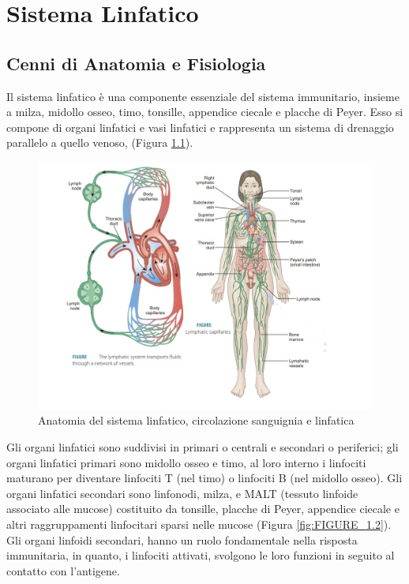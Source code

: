 \chapter{Sistema Linfatico}

\section{Cenni di Anatomia e Fisiologia}
Il sistema linfatico \`e una componente essenziale del sistema immunitario, 
insieme a milza, midollo osseo, timo, tonsille, appendice ciecale e placche di Peyer. 
Esso si compone di organi linfatici e vasi linfatici e rappresenta 
un sistema di drenaggio parallelo a quello venoso\cite{BOOK1}, (Figura \ref{fig:FIGURE_1.1}).\\

\begin{figure}[H]
    \begin{center}
    \includegraphics[width=0.9\columnwidth]{img/ANATOMY2.jpeg}
    \vspace{-3mm}
    \end{center}
    \caption{Anatomia del sistema linfatico, circolazione sanguignia e linfatica
    \cite{img1}}
    \label{fig:FIGURE_1.1}
\end{figure}


Gli organi linfatici sono suddivisi in primari o centrali 
e secondari o periferici; gli organi linfatici primari sono midollo osseo 
e timo, al loro interno i linfociti maturano per diventare linfociti T (nel timo) 
o linfociti B (nel midollo osseo). 
Gli organi linfatici secondari sono linfonodi, milza, e MALT 
(tessuto linfoide associato alle mucose) costituito da tonsille, 
placche di Peyer, appendice ciecale e altri raggruppamenti linfocitari 
sparsi nelle mucose (Figura \ref{fig:FIGURE_1.2}). Gli organi linfoidi secondari, hanno un ruolo fondamentale 
nella risposta immunitaria, in quanto, i linfociti attivati, svolgono le loro funzioni 
in seguito al contatto con l'antigene\cite{BOOK1}.\\

